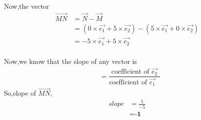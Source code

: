 \documentclass[journal,12pt,twocolumn]{IEEEtran}
\begin{document}
Now,the vector
\begin{align}
\vec{MN}&=\vec{N}-\vec{M}\\
&=(0\times\vec{e_1}+5\times\vec{e_2})-(5\times\vec{e_1}+0\times\vec{e_2})\\
&=-5\times\vec{e_1}+5\times\vec{e_2}\\
\end{align}

Now,we know that the slope of any vector is
\begin{align}
    &= \dfrac{\text{coefficient of $\vec{e_2}$}}{\text{coefficient of $\vec{e_1}$ }}
\end{align}
So,slope of $\vec{MN}$,
 \begin{align}
  slope &=\frac{5}{-5}\\
  &=\textbf{-1}             
\end{align}
\end{document}

